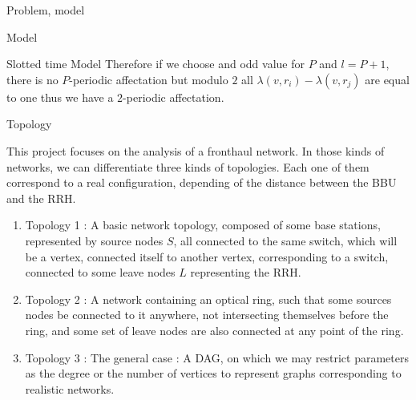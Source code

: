 \documentclass[a4paper,10pt]{report}
\begin{document}
\begin{chapter}{Problem, model}
\begin{section}{Model}
\begin{subsection}{Slotted time Model}
{{Therefore if we choose and odd value for $P$ and $l=P+1$, there is no $P$-periodic affectation but modulo $2$ all $\lambda(v,r_i) - \lambda(v,r_j)$
are equal to one thus we have a $2$-periodic affectation. 
}}
\end{subsection}
\begin{subsection}{Topology}

This project focuses on the analysis of a fronthaul network. In those kinds of networks, we can differentiate three kinds of
topologies. Each one of them correspond to a real configuration, depending of the distance between the BBU and the RRH.
\begin{enumerate}
 \item Topology 1 : A basic network topology, composed of some base stations, represented by source nodes $S$, all connected to the same switch,
which will be a vertex, connected itself to another vertex, corresponding to a switch, connected to some leave nodes $L$ representing the RRH.
\item Topology 2 : A network containing an optical ring, such that some sources nodes be connected to it anywhere, not intersecting themselves before the ring,
and some set of leave nodes are also connected at any point of the ring.
\item Topology 3 : The general case : A DAG, on which we may restrict parameters as the degree or the number of vertices to represent graphs corresponding to realistic networks.
\end{enumerate}
\end{subsection}
\end{section}
\end{chapter}
\end{document}
